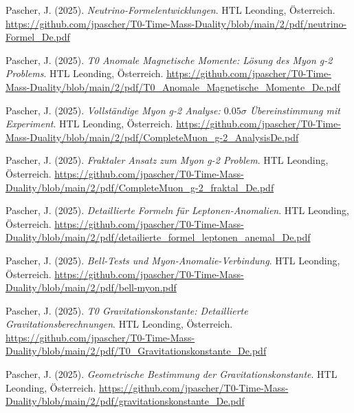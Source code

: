 \documentclass{article}
\begin{document}
\begin{thebibliography}{99}
		Pascher, J. (2025).
		\textit{Neutrino-Formelentwicklungen}.
		HTL Leonding, Österreich.
		\url{https://github.com/jpascher/T0-Time-Mass-Duality/blob/main/2/pdf/neutrino-Formel_De.pdf}
		
		
		Pascher, J. (2025).
		\textit{T0 Anomale Magnetische Momente: Lösung des Myon g-2 Problems}.
		HTL Leonding, Österreich.
		\url{https://github.com/jpascher/T0-Time-Mass-Duality/blob/main/2/pdf/T0_Anomale_Magnetische_Momente_De.pdf}
		
		Pascher, J. (2025).
		\textit{Vollständige Myon g-2 Analyse: $0.05\sigma$ Übereinstimmung mit Experiment}.
		HTL Leonding, Österreich.
		\url{https://github.com/jpascher/T0-Time-Mass-Duality/blob/main/2/pdf/CompleteMuon_g-2_AnalysisDe.pdf}
		
		Pascher, J. (2025).
		\textit{Fraktaler Ansatz zum Myon g-2 Problem}.
		HTL Leonding, Österreich.
		\url{https://github.com/jpascher/T0-Time-Mass-Duality/blob/main/2/pdf/CompleteMuon_g-2_fraktal_De.pdf}
		
		Pascher, J. (2025).
		\textit{Detaillierte Formeln für Leptonen-Anomalien}.
		HTL Leonding, Österreich.
		\url{https://github.com/jpascher/T0-Time-Mass-Duality/blob/main/2/pdf/detailierte_formel_leptonen_anemal_De.pdf}
		
		Pascher, J. (2025).
		\textit{Bell-Tests und Myon-Anomalie-Verbindung}.
		HTL Leonding, Österreich.
		\url{https://github.com/jpascher/T0-Time-Mass-Duality/blob/main/2/pdf/bell-myon.pdf}
		
		
		Pascher, J. (2025).
		\textit{T0 Gravitationskonstante: Detaillierte Gravitationsberechnungen}.
		HTL Leonding, Österreich.
		\url{https://github.com/jpascher/T0-Time-Mass-Duality/blob/main/2/pdf/T0_Gravitationskonstante_De.pdf}
		
		Pascher, J. (2025).
		\textit{Geometrische Bestimmung der Gravitationskonstante}.
		HTL Leonding, Österreich.
		\url{https://github.com/jpascher/T0-Time-Mass-Duality/blob/main/2/pdf/gravitationskonstante_De.pdf}
		

\end{thebibliography}
\end{document}
